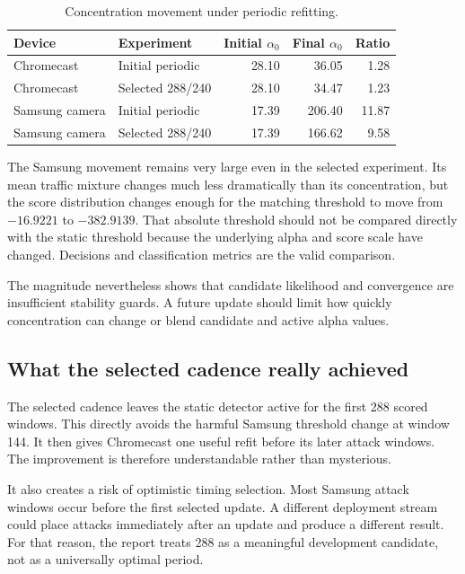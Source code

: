 \documentclass[11pt,a4paper]{article}
\begin{document}
\begin{table}[ht]
\centering
\small
\begin{tabular}{llrrr}
\toprule
\textbf{Device} & \textbf{Experiment} & \textbf{Initial $\alpha_0$} &
\textbf{Final $\alpha_0$} & \textbf{Ratio} \\
\midrule
Chromecast & Initial periodic & 28.10 & 36.05 & 1.28 \\
Chromecast & Selected 288/240 & 28.10 & 34.47 & 1.23 \\
Samsung camera & Initial periodic & 17.39 & 206.40 & 11.87 \\
Samsung camera & Selected 288/240 & 17.39 & 166.62 & 9.58 \\
\bottomrule
\end{tabular}
\caption{Concentration movement under periodic refitting.}
\label{tab:concentration}
\end{table}

The Samsung movement remains very large even in the selected experiment. Its
mean traffic mixture changes much less dramatically than its concentration,
but the score distribution changes enough for the matching threshold to move
from $-16.9221$ to $-382.9139$. That absolute threshold should not be compared
directly with the static threshold because the underlying alpha and score scale
have changed. Decisions and classification metrics are the valid comparison.

The magnitude nevertheless shows that candidate likelihood and convergence
are insufficient stability guards. A future update should limit how quickly
concentration can change or blend candidate and active alpha values.

\subsection{What the selected cadence really achieved}

The selected cadence leaves the static detector active for the first 288
scored windows. This directly avoids the harmful Samsung threshold change at
window 144. It then gives Chromecast one useful refit before its later attack
windows. The improvement is therefore understandable rather than mysterious.

It also creates a risk of optimistic timing selection. Most Samsung attack
windows occur before the first selected update. A different deployment stream
could place attacks immediately after an update and produce a different result.
For that reason, the report treats 288 as a meaningful development candidate,
not as a universally optimal period.
\end{document}

